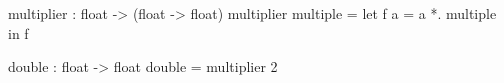 \begin{minipage}{3in}
  \begin{AVerb}[gobble=4,numbers=left]
    multiplier : float -> (float -> float)
    multiplier multiple = 
      let f a = a *. multiple \label{lang_fig2_ml_fun}
      in f

    double : float -> float
    double = multiplier 2 \label{lang_fig2_ml_double}
  \end{AVerb}
\end{minipage}
